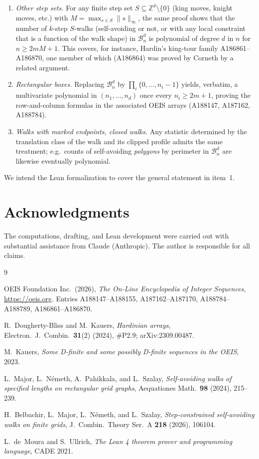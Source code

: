 \documentclass[11pt]{article}
\newcommand{\ZZ}{\mathbb{Z}}
\newcommand{\GBox}{\mathcal{B}}
\begin{document}
\begin{enumerate}
\item \emph{Other step sets.}  For any finite step set
  $S \subseteq \ZZ^d \setminus \{0\}$ (king moves, knight moves, etc.)
  with $M = \max_{s \in S} \|s\|_\infty$, the same proof shows that the
  number of $k$-step $S$-walks (self-avoiding or not, or with any local
  constraint that is a function of the walk shape) in $\GBox_n^d$ is
  polynomial of degree $d$ in $n$ for $n \ge 2mM + 1$.  This covers, for
  instance, Hardin's king-tour family A186861--A186870, one member of
  which (A186864) was proved by Corneth by a related argument.
\item \emph{Rectangular boxes.}  Replacing $\GBox_n^d$ by
  $\prod_i \{0,\dots,n_i-1\}$ yields, verbatim, a multivariate polynomial
  in $(n_1,\dots,n_d)$ once every $n_i \ge 2m+1$, proving the
  row-and-column formulas in the associated OEIS arrays (A188147,
  A187162, A188784).
\item \emph{Walks with marked endpoints, closed walks.}  Any statistic
  determined by the translation class of the walk and its clipped profile
  admits the same treatment; e.g.\ counts of self-avoiding \emph{polygons}
  by perimeter in $\GBox_n^d$ are likewise eventually polynomial.
\end{enumerate}

We intend the Lean formalization to cover the general statement in
item~1.

\section*{Acknowledgments}

The computations, drafting, and Lean development were carried out with
substantial assistance from Claude (Anthropic).  The author is
responsible for all claims.

\begin{thebibliography}{9}

OEIS Foundation Inc.\ (2026), \emph{The On-Line Encyclopedia of Integer
Sequences}, \url{https://oeis.org}.  Entries A188147--A188155,
A187162--A187170, A188784--A188789, A186861--A186870.

R.~Dougherty-Bliss and M.~Kauers, \emph{Hardinian arrays},
Electron.\ J.\ Combin.\ \textbf{31}(2) (2024), \#P2.9; arXiv:2309.00487.

M.~Kauers, \emph{Some D-finite and some possibly D-finite sequences in
the OEIS}, 2023.

L.~Major, L.~N\'emeth, A.~Pahikkala, and L.~Szalay,
\emph{Self-avoiding walks of specified lengths on rectangular grid
graphs}, Aequationes Math.\ \textbf{98} (2024), 215--239.

H.~Belbachir, L.~Major, L.~N\'emeth, and L.~Szalay,
\emph{Step-constrained self-avoiding walks on finite grids},
J.\ Combin.\ Theory Ser.\ A \textbf{218} (2026), 106104.

L.~de~Moura and S.~Ullrich, \emph{The Lean 4 theorem prover and
programming language}, CADE 2021.

\end{thebibliography}
\end{document}

